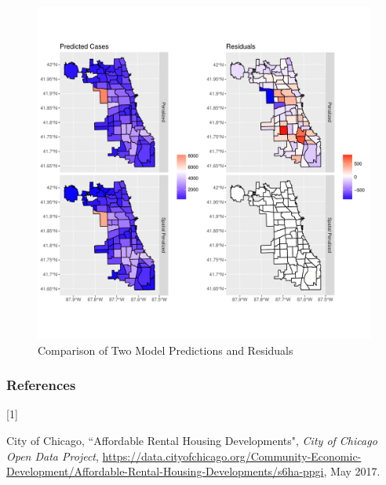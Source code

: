 \documentclass{article} %
\begin{document}
\begin{center}
\begin{figure}[ht]
\includegraphics[width = \textwidth]{Plots/results}
\caption{Comparison of Two Model Predictions and Residuals}
\label{fig:spatialplots}
\end{figure}
\end{center}







\clearpage\newpage


\subsubsection*{References}

\hypertarget{Ref1}{[1]} City of Chicago, ``Affordable Rental Housing Developments", \textit{City of Chicago Open Data Project}, \url{https://data.cityofchicago.org/Community-Economic-Development/Affordable-Rental-Housing-Developments/s6ha-ppgi}, May 2017.
\end{document}
